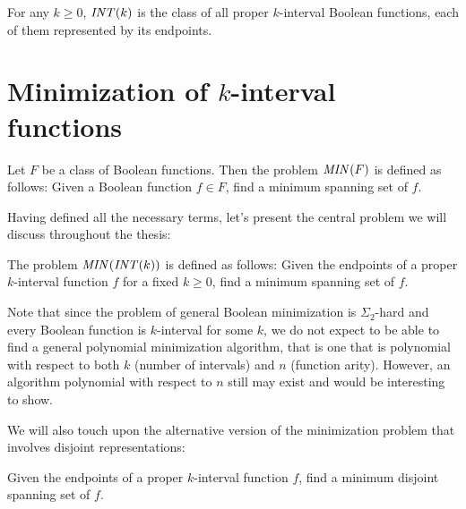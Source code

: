 \begin{definition}
[$\intervalfns{k}$]
\label{def:intervalfns}
For any $k \geq 0$,
$\intervalfns{k}$ is the class
of all proper $k$-interval Boolean functions,
each of them represented by its endpoints.
\end{definition}

\section{Minimization of \texorpdfstring{$k$}{k}-interval functions}

\begin{problem}
\label{problem:minimization}
Let $F$ be a class of Boolean functions.
Then the problem $\mathit{MIN} (F)$ is defined as follows:
Given a Boolean function $f \in F$,
find a minimum spanning set of $f$.
\end{problem}

Having defined all the necessary terms,
let's present the central problem
we will discuss throughout the thesis:
\begin{problem}
\label{problem:allintervalfnsminimization}
The problem $\mathit{MIN} (\mathit{INT} (k))$ is defined as follows:
Given the endpoints
of a proper $k$-interval function $f$
for a fixed $k \geq 0$,
find a minimum spanning set of $f$.
\end{problem}

Note that since the problem
of general Boolean minimization
is $\Sigma_2$-hard \citep{Umans1998}
and every Boolean function is $k$-interval for some $k$,
we do not expect to be able to find
a general polynomial minimization algorithm,
that is one that is polynomial
with respect to both $k$ (number of intervals) and $n$ (function arity).
However,
an algorithm polynomial with respect to $n$ still may exist and would be interesting to show.

We will also touch upon the alternative version
of the minimization problem
that involves disjoint representations:
\begin{problem}
\label{problem:disjointminimum}
Given the endpoints
of a proper $k$-interval function $f$,
find a minimum disjoint spanning set of $f$.
\end{problem}

